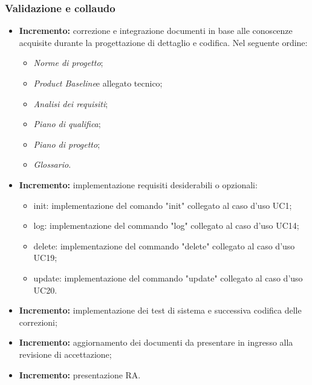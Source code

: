 \subsubsection{Validazione e collaudo }
\begin{itemize}
  \item \textbf{ Incremento:} correzione e integrazione documenti in base alle conoscenze acquisite durante la progettazione di dettaglio e codifica. Nel seguente ordine:
  \begin{itemize}
    \item \textit{Norme di progetto}\docs;
    \item \textit{Product Baseline}\glo e allegato tecnico;
    \item \textit{Analisi dei requisiti}\docs;
    \item \textit{Piano di qualifica}\docs;
    \item \textit{Piano di progetto}\docs;
    \item \textit{Glossario}\docs.
  \end{itemize}
	\item \textbf{ Incremento:} implementazione requisiti desiderabili o opzionali:
	\begin{itemize}
		\item init: implementazione del comando "init" collegato al caso d'uso UC1;
		\item log: implementazione del commando "log" collegato al caso d'uso UC14;
		\item delete: implementazione del commando "delete" collegato al caso d'uso UC19;
		\item update: implementazione del commando "update" collegato al caso d'uso UC20.
	\end{itemize}
	\item \textbf{ Incremento:} implementazione dei test di sistema e successiva codifica delle correzioni;
	\item \textbf{ Incremento:} aggiornamento dei documenti da presentare in ingresso alla revisione di accettazione;
	\item \textbf{ Incremento:} presentazione RA.
\end{itemize}
